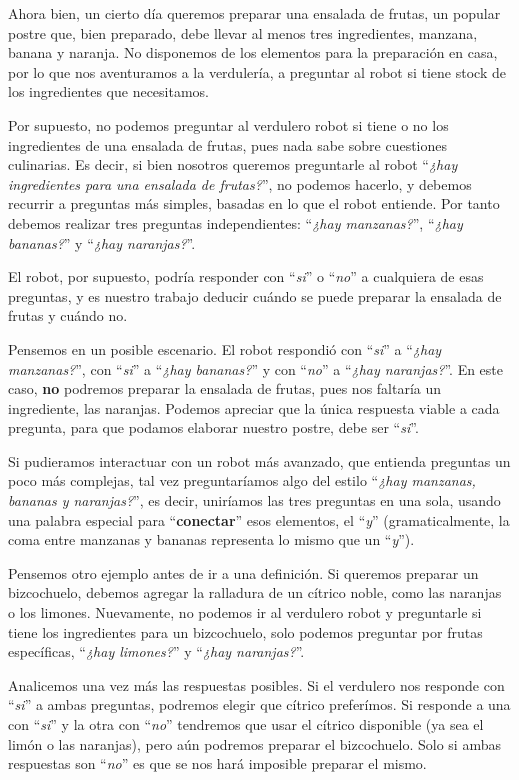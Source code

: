 Ahora bien, un cierto día queremos preparar una ensalada de frutas, un popular
postre que, bien preparado, debe llevar al menos tres ingredientes, manzana,
banana y naranja. No disponemos de los elementos para la preparación en casa,
por lo que nos aventuramos a la verdulería, a preguntar al robot si tiene stock
de los ingredientes que necesitamos.

Por supuesto, no podemos preguntar al verdulero robot si tiene o no los
ingredientes de una ensalada de frutas, pues nada sabe sobre cuestiones
culinarias. Es decir, si bien nosotros queremos preguntarle al robot
``\textit{¿hay ingredientes para una ensalada de frutas?}'', no podemos hacerlo,
y debemos recurrir a preguntas más simples, basadas en lo que el robot entiende.
Por tanto debemos realizar tres preguntas independientes: ``\textit{¿hay
manzanas?}'', ``\textit{¿hay bananas?}'' y ``\textit{¿hay naranjas?}''.

El robot, por supuesto, podría responder con ``\textit{si}'' o ``\textit{no}'' a
cualquiera de esas preguntas, y es nuestro trabajo deducir cuándo se puede
preparar la ensalada de frutas y cuándo no.

Pensemos en un posible escenario. El robot respondió con ``\textit{si}'' a
``\textit{¿hay manzanas?}'', con ``\textit{si}'' a ``\textit{¿hay bananas?}'' y
con ``\textit{no}'' a ``\textit{¿hay naranjas?}''. En este caso, \textbf{no}
podremos preparar la ensalada de frutas, pues nos faltaría un ingrediente, las
naranjas. Podemos apreciar que la única respuesta viable a cada pregunta, para
que podamos elaborar nuestro postre, debe ser ``\textit{si}''.

Si pudieramos interactuar con un robot más avanzado, que entienda preguntas un
poco más complejas, tal vez preguntaríamos algo del estilo ``\textit{¿hay
manzanas, bananas y naranjas?}'', es decir, uniríamos las tres preguntas en una
sola, usando una palabra especial para ``\textbf{conectar}'' esos elementos, el
``\textit{y}'' (gramaticalmente, la coma entre manzanas y bananas representa lo
mismo que un ``\textit{y}'').

Pensemos otro ejemplo antes de ir a una definición. Si queremos preparar un
bizcochuelo, debemos agregar la ralladura de un cítrico noble, como las naranjas
o los limones. Nuevamente, no podemos ir al verdulero robot y preguntarle si
tiene los ingredientes para un bizcochuelo, solo podemos preguntar por frutas
específicas, ``\textit{¿hay limones?}'' y ``\textit{¿hay naranjas?}''.

Analicemos una vez más las respuestas posibles. Si el verdulero nos responde con
``\textit{si}'' a ambas preguntas, podremos elegir que cítrico preferímos. Si
responde a una con ``\textit{si}'' y la otra con ``\textit{no}'' tendremos que
usar el cítrico disponible (ya sea el limón o las naranjas), pero aún podremos
preparar el bizcochuelo. Solo si ambas respuestas son ``\textit{no}'' es que se
nos hará imposible preparar el mismo.

